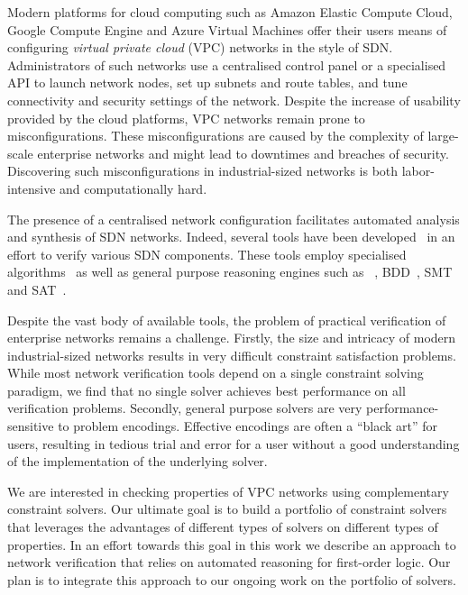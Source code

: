 Modern platforms for cloud computing such as Amazon Elastic Compute Cloud, Google Compute Engine and Azure Virtual Machines offer their users means of configuring \emph{virtual private cloud} (VPC) networks in the style of SDN. Administrators of such networks use a centralised control panel or a specialised API to launch network nodes, set up subnets and route tables, and tune connectivity and security settings of the network. Despite the increase of usability provided by the cloud platforms, VPC networks remain prone to misconfigurations. These misconfigurations are caused by the complexity of large-scale enterprise networks and might lead to downtimes and breaches of security. Discovering such misconfigurations in industrial-sized networks is both labor-intensive and computationally hard. %

The presence of a centralised network configuration facilitates automated analysis and synthesis of SDN networks. Indeed, several tools have been developed~\cite{batfish,jayaraman2014automated,DBLP:conf/icdcit/BjornerJ15,DBLP:conf/pldi/BallBGIKSSV14,Veriflow,ConfigChecker,Anteater,DBLP:conf/cav/El-HassanyTVV17} in an effort to verify various SDN components. These tools employ specialised algorithms~\cite{Veriflow} as well as general purpose reasoning engines such as \Datalog~\cite{muZ, DBLP:conf/cav/El-HassanyTVV17,batfish}, BDD~\cite{ConfigChecker}, SMT~\cite{jayaraman2014automated,DBLP:conf/icdcit/BjornerJ15} and SAT~\cite{Anteater,DBLP:conf/pldi/BallBGIKSSV14}.

%
%
Despite the vast body of available tools, the problem of practical verification of enterprise networks remains a challenge. Firstly, the size and intricacy of modern industrial-sized networks results in very difficult constraint satisfaction problems. While most network verification tools depend on a single constraint solving paradigm, we find that no single solver achieves best performance on all verification problems. Secondly, general purpose solvers are very performance-sensitive to problem encodings. Effective encodings are often a ``black art'' for users, resulting in tedious trial and error for a user without a good understanding of the implementation of the underlying solver.

We are interested in checking properties of VPC networks using complementary constraint solvers. Our ultimate goal is to build a portfolio of constraint solvers that leverages the advantages of different types of solvers on different types of properties. In an effort towards this goal in this work we describe an approach to network verification that relies on automated reasoning for first-order logic. Our plan is to integrate this approach to our ongoing work on the portfolio of solvers.

